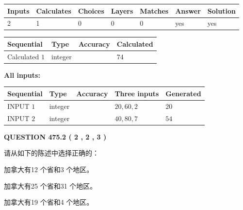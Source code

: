 \documentclass{ctexart}
\begin{document}
   
\noindent\begin{tabular}{|l|l|l|l|l|l|l|}
 \hline
Inputs & Calculates & Choices & Layers & Matches & Answer & Solution \\ \hline
 2  & 
 1  & 
 0
  & 
 0  & 
 0  & 
  yes & 
  yes 
  \\ \hline
 \end{tabular}
   
   
   
   
\noindent{}
   
   
  
  
\noindent\begin{tabular}{|l|l|l|l|}
\hline
 Sequential & Type & Accuracy & Calculated \\ 
\hline
 
 
  Calculated $  1 $ & integer &  & 
  $ 74 $ 
 \\  \hline  
 \end{tabular}
   
   
   
   
\noindent\vspace{0.1in}\hspace{-0.08in} {\textbf{\Large{All inputs: }}}
   
   
  
  
\noindent\begin{tabular}{|l|l|l|l|l|}
\hline
 Sequential & Type & Accuracy & Three inputs & Generated \\ 
\hline
 
 
  INPUT $  1 $ & integer &  & $
 20
 , 
 60
 , 
 2
 $ & $ 20 $ 
 \\  \hline  
 
 
  INPUT $  2 $ & integer &  & $
 40
 , 
 80
 , 
 7
 $ & $ 54 $ 
 \\  \hline  
 \end{tabular}
   
   
  
\vspace{0.2in}
  
{\textbf{\Large{QUESTION
475.2 
 ( 2 , 2 , 3 )
}}}
  
  
请从如下的陈述中选择正确的：
 
 
加拿大有12 个省和3 个地区。
 
 
加拿大有25 个省和31 个地区。
 
 
加拿大有19 个省和4 个地区。
 
\end{document}
